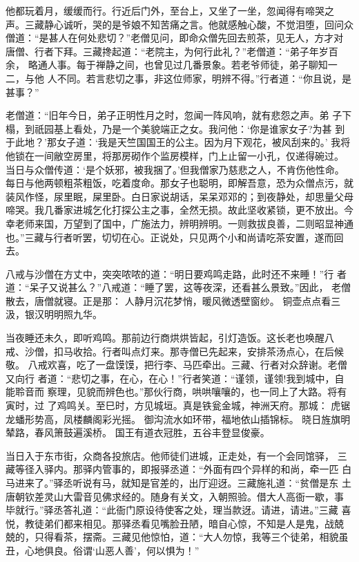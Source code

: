 他都玩着月，缓缓而行。行近后门外，至台上，又坐了一坐，忽闻得有啼哭之
声。三藏静心诚听，哭的是爷娘不知苦痛之言。他就感触心酸，不觉泪堕，回问众
僧道：“是甚人在何处悲切？”老僧见问，即命众僧先回去煎茶，见无人，方才对
唐僧、行者下拜。三藏搀起道：“老院主，为何行此礼？”老僧道：“弟子年岁百余，
略通人事。每于禅静之间，也曾见过几番景象。若老爷师徒，弟子聊知一二，与他
人不同。若言悲切之事，非这位师家，明辨不得。”行者道：“你且说，是甚事？”

老僧道：“旧年今日，弟子正明性月之时，忽闻一阵风响，就有悲怨之声。弟
子下榻，到祇园基上看处，乃是一个美貌端正之女。我问他：‘你是谁家女子?为甚
到于此地？’那女子道：‘我是天竺国国王的公主。因为月下观花，被风刮来的。’
我将他锁在一间敝空房里，将那房砌作个监房模样，门上止留一小孔，仅递得碗过。
当日与众僧传道：‘是个妖邪，被我捆了。’但我僧家乃慈悲之人，不肯伤他性命。
每日与他两顿粗茶粗饭，吃着度命。那女子也聪明，即解吾意，恐为众僧点污，就
装风作怪，尿里眠，屎里卧。白日家说胡话，呆呆邓邓的；到夜静处，却思量父母
啼哭。我几番家进城乞化打探公主之事，全然无损。故此坚收紧锁，更不放出。今
幸老师来国，万望到了国中，广施法力，辨明辨明。一则救拔良善，二则昭显神通
也。”三藏与行者听罢，切切在心。正说处，只见两个小和尚请吃茶安置，遂而回
去。

八戒与沙僧在方丈中，突突哝哝的道：“明日要鸡鸣走路，此时还不来睡！”行
者道：“呆子又说甚么？”八戒道：“睡了罢，这等夜深，还看甚么景致。”因此，
老僧散去，唐僧就寝。正是那：
人静月沉花梦悄，暖风微透壁窗纱。
铜壶点点看三汲，银汉明明照九华。

当夜睡还未久，即听鸡鸣。那前边行商烘烘皆起，引灯造饭。这长老也唤醒八
戒、沙僧，扣马收拾。行者叫点灯来。那寺僧已先起来，安排茶汤点心，在后候敬。
八戒欢喜，吃了一盘馍馍，把行李、马匹牵出。三藏、行者对众辞谢。老僧又向行
者道：“悲切之事，在心，在心！”行者笑道：“谨领，谨领!我到城中，自能聆音而
察理，见貌而辨色也。”那伙行商，哄哄嚷嚷的，也一同上了大路。将有寅时，过
了鸡鸣关。至巳时，方见城垣。真是铁瓮金城，神洲天府。那城：
虎锯龙蟠形势高，凤楼麟阁彩光摇。
御沟流水如环带，福地依山插锦标。
晓日旌旗明辇路，春风箫鼓遍溪桥。
国王有道衣冠胜，五谷丰登显俊豪。

当日入于东市街，众商各投旅店。他师徒们进城，正走处，有一个会同馆驿，
三藏等径入驿内。那驿内管事的，即报驿丞道：“外面有四个异样的和尚，牵一匹
白马进来了。”驿丞听说有马，就知是官差的，出厅迎迓。三藏施礼道：“贫僧是东
土唐朝钦差灵山大雷音见佛求经的。随身有关文，入朝照验。借大人高衙一歇，事
毕就行。”驿丞答礼道：“此衙门原设待使客之处，理当款迓。请进，请进。”三藏
喜悦，教徒弟们都来相见。那驿丞看见嘴脸丑陋，暗自心惊，不知是人是鬼，战兢
兢的，只得看茶，摆斋。三藏见他惊怕，道：“大人勿惊，我等三个徒弟，相貌虽
丑，心地俱良。俗谓‘山恶人善’，何以惧为！”

